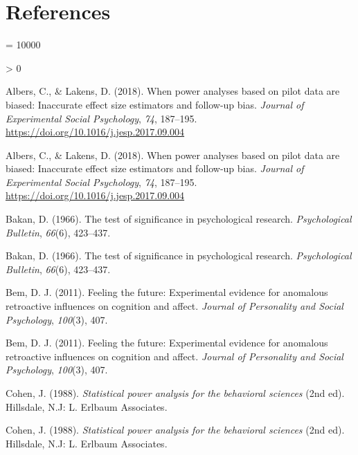 \documentclass[
  english,
  ,jou, a4paper,floatsintext]{apa6}
\newlength{\cslhangindent}
\newenvironment{CSLReferences}[2] %
 {%
  \setlength{\parindent}{0pt}
  \ifodd #1 \everypar{\setlength{\hangindent}{\cslhangindent}}\ignorespaces\fi
  \ifnum #2 > 0
  \setlength{\parskip}{#2\baselineskip}
  \fi
 }%
 {}
\begin{document}
\hypertarget{references}{%
\section{References}\label{references}}

\begingroup

\interlinepenalty = 10000

\hypertarget{refs}{}
\begin{CSLReferences}{1}{0}
\leavevmode\hypertarget{ref-albers_when_2018}{}%
Albers, C., \& Lakens, D. (2018). When power analyses based on pilot data are biased: {Inaccurate} effect size estimators and follow-up bias. \emph{Journal of Experimental Social Psychology}, \emph{74}, 187--195. \url{https://doi.org/10.1016/j.jesp.2017.09.004}

\leavevmode\hypertarget{ref-albers_when_2018}{}%
Albers, C., \& Lakens, D. (2018). When power analyses based on pilot data are biased: {Inaccurate} effect size estimators and follow-up bias. \emph{Journal of Experimental Social Psychology}, \emph{74}, 187--195. \url{https://doi.org/10.1016/j.jesp.2017.09.004}

\leavevmode\hypertarget{ref-bakan_test_1966}{}%
Bakan, D. (1966). The test of significance in psychological research. \emph{Psychological Bulletin}, \emph{66}(6), 423--437.

\leavevmode\hypertarget{ref-bakan_test_1966}{}%
Bakan, D. (1966). The test of significance in psychological research. \emph{Psychological Bulletin}, \emph{66}(6), 423--437.

\leavevmode\hypertarget{ref-bem2011feeling}{}%
Bem, D. J. (2011). Feeling the future: Experimental evidence for anomalous retroactive influences on cognition and affect. \emph{Journal of Personality and Social Psychology}, \emph{100}(3), 407.

\leavevmode\hypertarget{ref-bem2011feeling}{}%
Bem, D. J. (2011). Feeling the future: Experimental evidence for anomalous retroactive influences on cognition and affect. \emph{Journal of Personality and Social Psychology}, \emph{100}(3), 407.

\leavevmode\hypertarget{ref-cohen_statistical_1988}{}%
Cohen, J. (1988). \emph{Statistical power analysis for the behavioral sciences} (2nd ed). {Hillsdale, N.J}: {L. Erlbaum Associates}.

\leavevmode\hypertarget{ref-cohen_statistical_1988}{}%
Cohen, J. (1988). \emph{Statistical power analysis for the behavioral sciences} (2nd ed). {Hillsdale, N.J}: {L. Erlbaum Associates}.


\end{CSLReferences}
\end{document}
